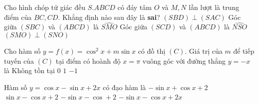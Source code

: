 \begin{ex}%
	Cho hình chóp tứ giác đều $ S.ABCD $ có đáy tâm $ O $ và $ M,N $ lần lượt là trung điểm của $ BC, CD .$ Khẳng định nào sau đây là \textbf{sai}?
	\choice
	{$(SBD)\perp(SAC)$}
	{Góc giữa $ (SBC) $ và $ (ABCD) $ là $ \widehat{SMO} $}
	{\True Góc giữa $ (SCD) $ và $ (ABCD) $ là $ \widehat{NSO} $}
	{$ (SMO)\perp(SNO) $}
\end{ex}

\begin{ex}%
	Cho hàm số $ y=f(x)=\cos^2x+m\sin x $ có đồ thị $ (C) $. Giá trị của $ m $ để tiếp tuyến của $ (C) $ tại điểm có hoành độ $ x=\pi $ vuông góc với đường thẳng $ y=-x $ là
	\choice
	{Không tồn tại}
	{$0$}
	{$1$}
	{\True $-1$}
\end{ex}

\begin{ex}%
	Hàm số $ y=\cos x-\sin x+2x $  có đạo hàm là
	\choice
	{$-\sin x+\cos x+2$}
	{$\sin x-\cos x+2$}
	{\True $-\sin x-\cos+2$}
	{$-\sin x-\cos x+2x$}
\end{ex}

